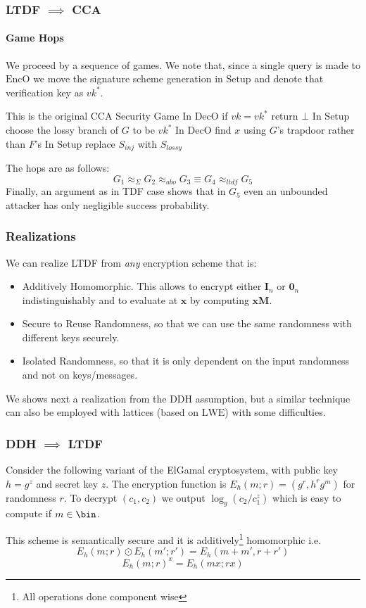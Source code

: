 \documentclass{beamer}
\begin{document}
\begin{frame}
    \frametitle{LTDF $\implies$ CCA}
    \framesubtitle{Game Hops}
    We proceed by a sequence of games. We note that, since a single query
    is made to $\mathrm{EncO}$ we move the signature scheme generation in
    $\mathrm{Setup}$ and denote that verification key as $vk^*$.
    \begin{gamedescription}[name=G]
        \describegame This is the original CCA Security Game
        \describegame In $\mathrm{DecO}$ if $vk=vk^*$ return $\bot$
        \describegame In $\mathrm{Setup}$ choose the lossy branch of $G$ to be $vk^*$
        \describegame In $\mathrm{DecO}$ find $x$ using $G$'s trapdoor rather than $F$'s
        \describegame In $\mathrm{Setup}$ replace $S_{inj}$ with $S_{lossy}$
    \end{gamedescription}
    The hops are as follows:
    \[ G_1 \approx_\Sigma G_2\approx_{abo} G_3 \equiv G_4 \approx_{ltdf} G_5 \]
    Finally, an argument as in TDF case shows that in $G_5$ even an unbounded attacker has only
    negligible success probability.
\end{frame}
\begin{frame}
    \frametitle{Realizations}
    We can realize LTDF from \textit{any} encryption scheme that is:
    \begin{itemize}
        \item Additively Homomorphic. This allows to encrypt either $\mathbf{I}_n$ or $\mathbf{0}_n$ indistinguishably and to
              evaluate at $\mathbf{x}$ by computing $\mathbf{xM}$.
        \item Secure to Reuse Randomness, so that we can use the same randomness with different keys securely.
        \item Isolated Randomness, so that it is only dependent on the input randomness and not on keys/messages.
    \end{itemize}
    We shows next a realization from the DDH assumption, but a similar technique
    can also be employed with lattices (based on $\mathrm{LWE}$) with some difficulties.
\end{frame}
\begin{frame}
    \frametitle{DDH $\implies$ LTDF}
    Consider the following variant of the ElGamal cryptosystem, with public key $h = g^z$ and secret key $z$.
    The encryption function is $E_h(m; r) = (g^r, h^r g^m)$ for randomness $r$. To decrypt $(c_1, c_2)$
    we output $\log_g(c_2/c_1^z)$ which is easy to compute if $m \in \bin$.

    This scheme is semantically secure and it is additively\footnote{All operations done component wise} homomorphic i.e.
    \[ E_h(m; r) \odot E_h(m'; r') = E_h(m + m', r + r')\]
    \[ E_h(m; r)^x = E_h(mx; rx) \]
\end{frame}
\end{document}
